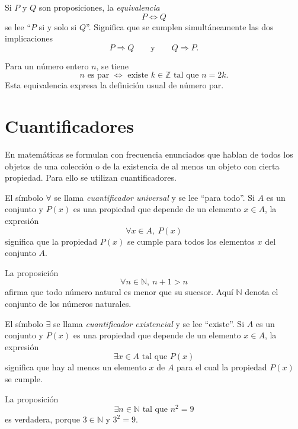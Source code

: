 \begin{definicion}[Equivalencia]
Si $P$ y $Q$ son proposiciones, la \emph{equivalencia}
\[
  P\Leftrightarrow Q
\]
se lee ``$P$ si y solo si $Q$''. Significa que se cumplen simultáneamente las dos implicaciones
\[
  P\Rightarrow Q
  \qquad \text{y} \qquad
  Q\Rightarrow P.
\]
\end{definicion}

\begin{ejemplo}
Para un número entero $n$, se tiene
\[
  n \text{ es par } \Leftrightarrow \text{ existe } k\in\mathbb{Z} \text{ tal que } n=2k.
\]
Esta equivalencia expresa la definición usual de número par.
\end{ejemplo}

\section{Cuantificadores}

En matemáticas se formulan con frecuencia enunciados que hablan de todos los objetos de una colección o de la existencia de al menos un objeto con cierta propiedad. Para ello se utilizan cuantificadores.

\begin{definicion}
El símbolo $\forall$ se llama \emph{cuantificador universal} y se lee ``para todo''. Si $A$ es un conjunto y $P(x)$ es una propiedad que depende de un elemento $x\in A$, la expresión
\[
  \forall x\in A,\ P(x)
\]
significa que la propiedad $P(x)$ se cumple para todos los elementos $x$ del conjunto $A$.
\end{definicion}

\begin{ejemplo}
La proposición
\[
  \forall n\in\mathbb{N},\ n+1>n
\]
afirma que todo número natural es menor que su sucesor. Aquí $\mathbb{N}$ denota el conjunto de los números naturales.
\end{ejemplo}

\begin{definicion}
El símbolo $\exists$ se llama \emph{cuantificador existencial} y se lee ``existe''. Si $A$ es un conjunto y $P(x)$ es una propiedad que depende de un elemento $x\in A$, la expresión
\[
  \exists x\in A \text{ tal que } P(x)
\]
significa que hay al menos un elemento $x$ de $A$ para el cual la propiedad $P(x)$ se cumple.
\end{definicion}

\begin{ejemplo}
La proposición
\[
  \exists n\in\mathbb{N} \text{ tal que } n^2=9
\]
es verdadera, porque $3\in\mathbb{N}$ y $3^2=9$.
\end{ejemplo}

